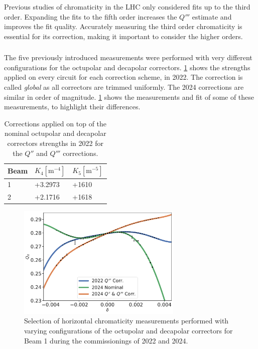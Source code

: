 Previous studies of chromaticity in the LHC only considered fits up to the third order.
Expanding the fits to the fifth order increases the $Q'''$ estimate and improves the fit quality. 
Accurately measuring the third order chromaticity is essential for its correction, making it
important to consider the higher orders.



\subsubsection{}

The five previously introduced measurements were performed with very different configurations for
the octupolar and decapolar correctors. \cref{tab:high_orders:mcdo_values_corr} shows the strengths
applied on every circuit for each correction scheme, in 2022. The correction is called 
\textit{global} as all correctors are trimmed uniformly. The 2024 corrections are similar in order
of magnitude.
\cref{fig:high_orders:comparison_2022_2024} shows the measurements and fit of some of these
measurements, to highlight their differences.

\begin{table}[H]
  \centering
  \begin{tabular}{lll}
  \toprule
    Beam  &    $K_4 [\mathrm{m}^{-4}]$      &  $K_5 [\mathrm{m}^{-5}]$  \\
  \midrule
      1   &   +3.2973    &  +1610   \\
      2   &   +2.1716    &  +1618   \\
  \bottomrule
  \end{tabular}
  \caption{Corrections applied on top of the nominal octupolar and decapolar correctors strengths in
  2022 for the $Q''$ and $Q'''$ corrections.}
  \label{tab:high_orders:mcdo_values_corr}
\end{table}

\begin{figure}[H]
  \centering
  \includegraphics[width=0.7\textwidth]{./images/chromaticity_2024_vs_2022/chroma_comparison_B1_X.pdf}
  \caption{Selection of horizontal chromaticity measurements performed with varying configurations
  of the octupolar and decapolar correctors for Beam 1 during the commissionings of 2022 and 2024.}
  \label{fig:high_orders:comparison_2022_2024}
\end{figure}

